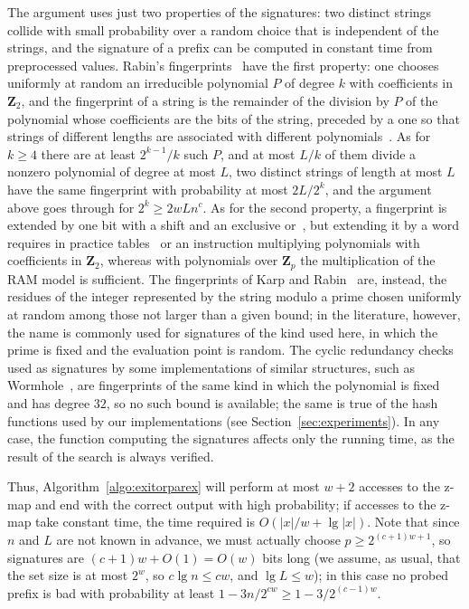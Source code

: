 \documentclass[a4paper]{article}
\newcommand{\?}{\mskip1.5mu}
\begin{document}
The argument uses just two properties of the signatures: two distinct strings collide with small probability over a random choice that is
independent of the strings, and the signature of a prefix can be computed in constant time from preprocessed values. 
Rabin's fingerprints~\cite{Rabin1981Fingerprinting} have the first property: one chooses uniformly at random an irreducible polynomial $P$ of 
degree $k$ with coefficients in $\mathbf Z_2$, and the fingerprint of a string is the remainder of the division by $P$ of the polynomial whose 
coefficients are the bits of the string, preceded by a one so that strings of different lengths are associated with different polynomials~\cite{Broder1993Some}. 
As for $k\geq 4$ there are at least $2^{k-1}/k$ such $P$, and at most $L/k$ of them divide a nonzero polynomial of degree at most $L$, two distinct strings of 
length at most $L$ have the same fingerprint with probability at most $2L/2^k$, and the argument above goes through for $2^k\geq 2wLn^c$.
As for the second property, a fingerprint is extended by one bit with a shift and an exclusive or~\cite{Rabin1981Fingerprinting}, 
but extending it by a word requires in practice tables~\cite{Broder1993Some} or an instruction multiplying polynomials with 
coefficients in $\mathbf Z_2$, whereas with polynomials over $\mathbf Z_p$ the multiplication of the RAM model is sufficient.
The fingerprints of Karp and Rabin~\cite{Karp1987Efficient} are, instead, the residues of the integer represented by the string modulo a prime chosen 
uniformly at random among those not larger than a given bound; in the literature, however, the name is commonly used for signatures of the kind 
used here, in which the prime is fixed and the evaluation point is random.
The cyclic redundancy checks used as signatures by some implementations of similar structures, such as Wormhole~\cite{WNJWormhole}, are 
fingerprints of the same kind in which the polynomial is fixed and has degree $32$, so no such bound is available; the same is true of the hash functions
used by our implementations (see Section~\ref{sec:experiments}).
In any case, the function computing the signatures affects only the running time, as the result of the search is always verified.

Thus,
Algorithm~\ref{algo:exitorparex} will perform at most $w+2$ accesses to the z-map and end with the correct output with
high probability; if accesses to the z-map take constant time, the time required is $O(|x|/w +\lg|x|)$.
Note that since $n$ and $L$ are not known in advance, we must actually choose $p\geq 2^{(c+1)w+1}$, so signatures
are $(c+1)w+O(1)=O(w)$ bits long (we assume, as usual, that the set
size is at most $2^w$, so $c\lg n\leq cw$, and $\lg L\leq w$); in this case no probed prefix is bad with probability
at least $1-3n/2^{cw}\geq 1-3/2^{(c-1)w}$.
\end{document}
